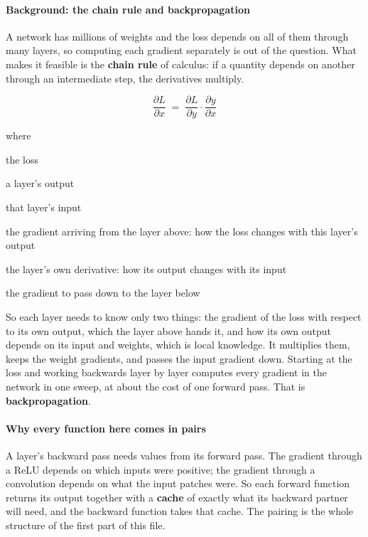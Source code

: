 \paragraph{Background: the chain rule and backpropagation}
A network has millions of weights and the loss depends on all of them through many layers, so computing each gradient separately is out of the question. What makes it feasible is the \textbf{chain rule} of calculus: if a quantity depends on another through an intermediate step, the derivatives multiply.


\begin{equation}
\frac{\partial L}{\partial x} \;=\; \frac{\partial L}{\partial y} \cdot \frac{\partial y}{\partial x}
\end{equation}

\noindent where
\begin{description}[leftmargin=2.4em,style=nextline,font=\normalfont\ttfamily]\setlength\itemsep{1pt}
  \item[{$L$}] \normalfont the loss
  \item[{$y$}] \normalfont a layer's output
  \item[{$x$}] \normalfont that layer's input
  \item[{$\frac{\partial L}{\partial y}$}] \normalfont the gradient arriving from the layer above: how the loss changes with this layer's output
  \item[{$\frac{\partial y}{\partial x}$}] \normalfont the layer's own derivative: how its output changes with its input
  \item[{$\frac{\partial L}{\partial x}$}] \normalfont the gradient to pass down to the layer below
\end{description}
So each layer needs to know only two things: the gradient of the loss with respect to its own output, which the layer above hands it, and how its own output depends on its input and weights, which is local knowledge. It multiplies them, keeps the weight gradients, and passes the input gradient down. Starting at the loss and working backwards layer by layer computes every gradient in the network in one sweep, at about the cost of one forward pass. That is \textbf{backpropagation}.


\paragraph{Why every function here comes in pairs}
A layer's backward pass needs values from its forward pass. The gradient through a ReLU depends on which inputs were positive; the gradient through a convolution depends on what the input patches were. So each forward function returns its output together with a \textbf{cache} of exactly what its backward partner will need, and the backward function takes that cache. The pairing is the whole structure of the first part of this file.

